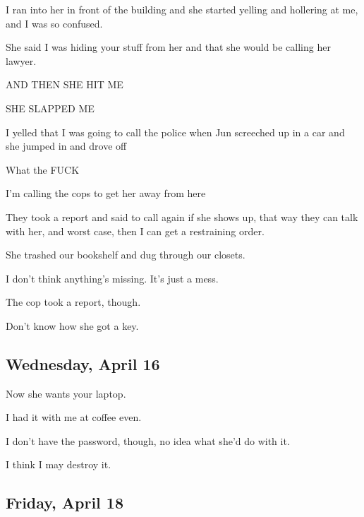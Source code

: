 {
I ran into her in front of the
building and she started yelling and hollering at me, and I was so
confused.

She said I was hiding your stuff
from her and that she would be calling her lawyer.

AND THEN SHE HIT ME

SHE SLAPPED ME

I yelled that I was going to call
the police when Jun screeched up in a car and she jumped in and drove
off

What the FUCK

I'm calling the cops to get her away
from here

They took a report and said to call
again if she shows up, that way they can talk with her, and worst case,
then I can get a restraining order.

She trashed our bookshelf and dug
through our closets.

I don't think anything's missing.
It's just a mess.

The cop took a report, though.

Don't know how she got a key.

\newpage

\subsection*{Wednesday, April 16}\label{wednesday-april-16}

Now she wants your laptop.

I had it with me at coffee even.

I don't have the password, though,
no idea what she'd do with it.

I think I may destroy it.

\newpage

\subsection*{Friday, April 18}\label{friday-april-18}

}
